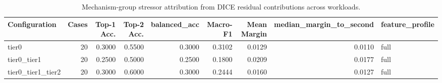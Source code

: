\begin{table}[t]
\centering
\caption{Mechanism-group stressor attribution from DICE residual contributions across workloads.}
\label{tab:dice_stressor_diagnosis}
\footnotesize
\begin{tabular}{lrrrrrrrl}
\toprule
Configuration & Cases & Top-1 Acc. & Top-2 Acc. & balanced_acc & Macro-F1 & Mean Margin & median_margin_to_second & feature_profile \\
\midrule
tier0 & 20 & 0.3000 & 0.5500 & 0.3000 & 0.3102 & 0.0129 & 0.0110 & full \\
tier0_tier1 & 20 & 0.2500 & 0.5000 & 0.2500 & 0.1800 & 0.0209 & 0.0177 & full \\
tier0_tier1_tier2 & 20 & 0.3000 & 0.6000 & 0.3000 & 0.2444 & 0.0160 & 0.0127 & full \\
\bottomrule
\end{tabular}

\end{table}
